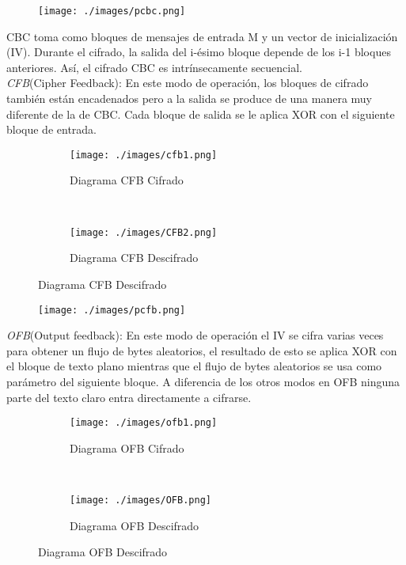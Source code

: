 \begin{figure}[H]
 \centering
	\texttt{[image: ./images/pcbc.png]}
	
\end{figure}

CBC toma como bloques de mensajes de entrada M y un vector de inicialización (IV). Durante el cifrado, la salida del i-ésimo bloque depende de los i-1 bloques anteriores. Así, el cifrado CBC es intrínsecamente secuencial.\\

\textit{CFB}(Cipher Feedback): En este modo de operación, los bloques de cifrado también están encadenados pero a la salida se produce de una manera muy diferente de la de CBC. Cada bloque de salida se le aplica XOR con el siguiente bloque de entrada.\\

\begin{figure}[h]
    \centering
    \begin{subfigure}[t]{0.5\textwidth}
        \centering
        \texttt{[image: ./images/cfb1.png]}
		\caption{Diagrama CFB Cifrado}
		\label{fig:1-5-1}
    \end{subfigure}%
    ~ 
    \begin{subfigure}[t]{0.5\textwidth}
        \centering
        \texttt{[image: ./images/CFB2.png]}
		\caption{Diagrama CFB Descifrado}
		\label{fig:1-5-1}
    \end{subfigure}
    \label{fig:protocol}
\end{figure}

\begin{figure}[H]
\centering
	\texttt{[image: ./images/pcfb.png]}
	
\end{figure}


\textit{OFB}(Output feedback): En este modo de operación el IV se cifra varias veces para obtener un flujo de bytes aleatorios, el resultado de esto se aplica XOR con el bloque de texto plano mientras que el flujo de bytes aleatorios se usa como parámetro del siguiente bloque. A diferencia de los otros modos en OFB ninguna parte del texto claro entra directamente a cifrarse.

\begin{figure}[h]
    \centering
    \begin{subfigure}[t]{0.5\textwidth}
        \centering
        \texttt{[image: ./images/ofb1.png]}
		\caption{Diagrama OFB Cifrado}
		\label{fig:1-6-1}
    \end{subfigure}%
    ~ 
    \begin{subfigure}[t]{0.5\textwidth}
        \centering
        \texttt{[image: ./images/OFB.png]}
		\caption{Diagrama OFB Descifrado}
		\label{fig:1-6-1}
    \end{subfigure}
    \label{fig:protocol}
\end{figure}

